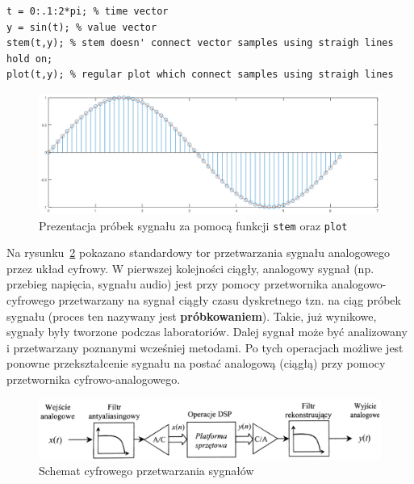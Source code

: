 \begin{lstlisting}[caption=Ciągły sygnał czasu dyskretnego, label=lab4/lst/discreteSignal ]
t = 0:.1:2*pi; % time vector
y = sin(t); % value vector
stem(t,y); % stem doesn' connect vector samples using straigh lines
hold on;
plot(t,y); % regular plot which connect samples using straigh lines
\end{lstlisting}

\begin{figure}[hbt!]
	\centering
	\includegraphics[width=0.95\linewidth]{images/discriteSignal.png}
	\caption{Prezentacja próbek sygnału za pomocą funkcji \texttt{stem} oraz \texttt{plot}}
	\label{lab4/fig/discriteSignal}
\end{figure}

Na rysunku~\ref{lab4/fig/digitalSignalProcessingDiagram} pokazano standardowy tor przetwarzania sygnału analogowego przez układ cyfrowy. W pierwszej kolejności ciągły, analogowy sygnał (np. przebieg napięcia, sygnału audio) jest przy pomocy przetwornika analogowo-cyfrowego przetwarzany na sygnał ciągły czasu dyskretnego tzn. na ciąg próbek sygnału (proces ten nazywany jest \textbf{próbkowaniem}). Takie, już wynikowe, sygnały były tworzone podczas laboratoriów. Dalej sygnał może być analizowany i przetwarzany poznanymi wcześniej metodami. Po tych operacjach możliwe jest ponowne przekształcenie sygnału na postać analogową (ciągłą) przy pomocy przetwornika cyfrowo-analogowego.

\begin{figure}[hbt!]
	\centering
	\includegraphics[width=0.9\linewidth]{images/digitalSignalProcessingDiagram.png}
	\caption{Schemat cyfrowego przetwarzania sygnałów~\cite{zielinski_cyfrowe_przetwarzanie_sygnalow}}
	\label{lab4/fig/digitalSignalProcessingDiagram}
\end{figure}

